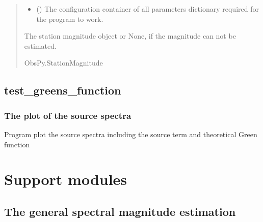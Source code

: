 \documentclass[letterpaper,10pt,english]{sphinxmanual}
\begin{document}
\begin{fulllineitems}
\begin{quote}
\begin{description}
\begin{itemize}
\item {} 
\sphinxAtStartPar
{} () \textendash{} The configuration container of all parameters dictionary required for the program to work.

\end{itemize}

\sphinxAtStartPar
The station magnitude object or None, if the magnitude can not be estimated.

\sphinxAtStartPar
ObsPy.StationMagnitude

\end{description}\end{quote}

\end{fulllineitems}



\subsection{test\_greens\_function}
\label{\detokenize{api_main:module-amw.mw.test_greens_function}}\label{\detokenize{api_main:test-greens-function}}

\subsubsection{The plot of the source spectra}
\label{\detokenize{api_main:the-plot-of-the-source-spectra}}
\sphinxAtStartPar
Program plot the source spectra including the source term and theoretical Green function

\sphinxstepscope


\section{Support modules}
\label{\detokenize{api_support:module-amw.mw.estimation}}\label{\detokenize{api_support:support-modules}}\label{\detokenize{api_support::doc}}

\subsection{The general spectral magnitude estimation}
\label{\detokenize{api_support:the-general-spectral-magnitude-estimation}}
\end{document}
